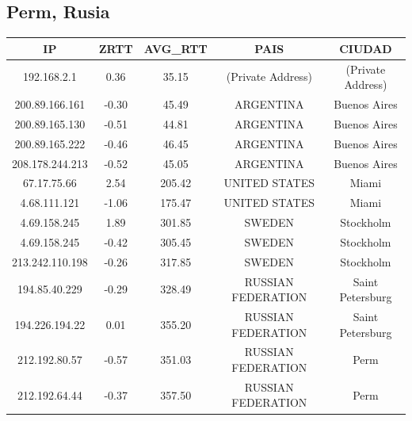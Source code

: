 \subsection{Perm, Rusia}

\begin{tabular}{|c@{\hspace{5ex}}c@{\hspace{5ex}}c@{\hspace{5ex}}c@{\hspace{5ex}}c|}
\hline
\rule{0pt}{1.2em}IP & ZRTT & AVG\_RTT & PAIS & CIUDAD\\[0.2em]
\hline

\rule{0pt}{1.2em} 192.168.2.1  &  0.36 & 35.15 & (Private Address) & (Private Address) \\[0.2em]
\rule{0pt}{1.2em} 200.89.166.161  &  -0.30 & 45.49 & ARGENTINA & Buenos Aires \\[0.2em]
\rule{0pt}{1.2em} 200.89.165.130  &  -0.51 & 44.81 & ARGENTINA & Buenos Aires \\[0.2em]
\rule{0pt}{1.2em} 200.89.165.222  &  -0.46 & 46.45 & ARGENTINA & Buenos Aires \\[0.2em]
\rule{0pt}{1.2em} 208.178.244.213  &  -0.52 & 45.05 & ARGENTINA & Buenos Aires \\[0.2em]
\rule{0pt}{1.2em} 67.17.75.66  &  2.54 & 205.42 & UNITED STATES & Miami \\[0.2em]
\rule{0pt}{1.2em} 4.68.111.121  &  -1.06 & 175.47 & UNITED STATES & Miami \\[0.2em]
\rule{0pt}{1.2em} 4.69.158.245  &  1.89 & 301.85 & SWEDEN & Stockholm \\[0.2em]
\rule{0pt}{1.2em} 4.69.158.245  &  -0.42 & 305.45 & SWEDEN & Stockholm \\[0.2em]
\rule{0pt}{1.2em} 213.242.110.198  &  -0.26 & 317.85 & SWEDEN & Stockholm \\[0.2em]
\rule{0pt}{1.2em} 194.85.40.229  &  -0.29 & 328.49 & RUSSIAN FEDERATION & Saint Petersburg \\[0.2em]
\rule{0pt}{1.2em} 194.226.194.22  &  0.01 & 355.20 & RUSSIAN FEDERATION & Saint Petersburg \\[0.2em]
\rule{0pt}{1.2em} 212.192.80.57  &  -0.57 & 351.03 & RUSSIAN FEDERATION & Perm \\[0.2em]
\rule{0pt}{1.2em} 212.192.64.44  &  -0.37 & 357.50 & RUSSIAN FEDERATION & Perm \\[0.2em]
\hline
\end{tabular}

\vspace{20pt}

